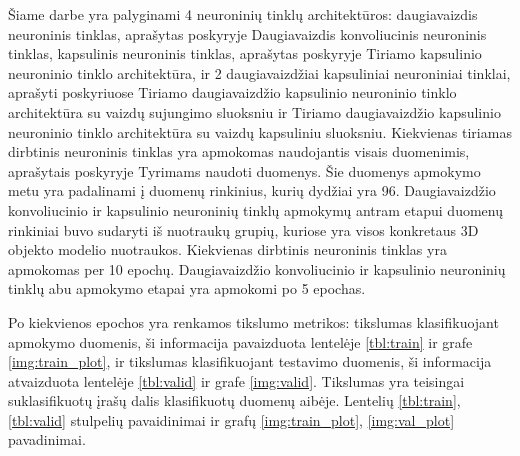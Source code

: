 
Šiame darbe yra palyginami 4 neuroninių tinklų architektūros: daugiavaizdis neuroninis tinklas, aprašytas poskyryje Daugiavaizdis konvoliucinis neuroninis tinklas, kapsulinis neuroninis tinklas, aprašytas poskyryje Tiriamo kapsulinio neuroninio tinklo architektūra, ir 2 daugiavaizdžiai kapsuliniai neuroniniai tinklai, aprašyti poskyriuose Tiriamo daugiavaizdžio kapsulinio neuroninio tinklo architektūra su vaizdų sujungimo sluoksniu ir Tiriamo daugiavaizdžio kapsulinio neuroninio tinklo architektūra su vaizdų kapsuliniu sluoksniu. Kiekvienas tiriamas dirbtinis neuroninis tinklas yra apmokomas naudojantis visais duomenimis, aprašytais poskyryje Tyrimams naudoti duomenys. Šie duomenys apmokymo metu yra padalinami į duomenų rinkinius, kurių dydžiai yra 96. Daugiavaizdžio konvoliucinio ir kapsulinio neuroninių tinklų apmokymų antram etapui duomenų rinkiniai buvo sudaryti iš nuotraukų grupių, kuriose yra visos konkretaus 3D objekto modelio nuotraukos. Kiekvienas dirbtinis neuroninis tinklas yra apmokomas per 10 epochų. Daugiavaizdžio konvoliucinio ir kapsulinio neuroninių tinklų abu apmokymo etapai yra apmokomi po 5 epochas.

Po kiekvienos epochos yra renkamos tikslumo metrikos: tikslumas klasifikuojant apmokymo duomenis, ši informacija pavaizduota lentelėje \ref{tbl:train} ir grafe \ref{img:train_plot}, ir tikslumas klasifikuojant testavimo duomenis, ši informacija atvaizduota lentelėje \ref{tbl:valid} ir grafe \ref{img:valid}. Tikslumas yra teisingai suklasifikuotų įrašų dalis klasifikuotų duomenų aibėje. Lentelių \ref{tbl:train}, \ref{tbl:valid} stulpelių pavaidinimai ir grafų \ref{img:train_plot}, \ref{img:val_plot} pavadinimai.

